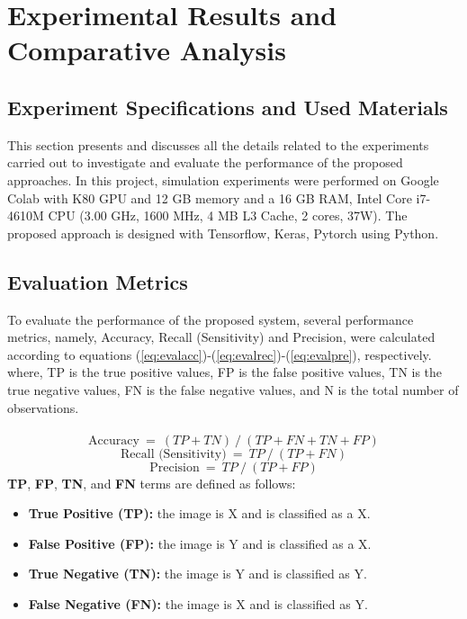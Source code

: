 \chapter{Experimental Results and Comparative Analysis}

\section{Experiment Specifications and Used Materials}

This section presents and discusses all the details related to the experiments 
carried out to investigate and evaluate the performance of the proposed approaches. 
In this project, simulation experiments were performed on Google Colab with K80 GPU 
and 12 GB memory and a 16 GB RAM, Intel Core i7-4610M CPU (3.00 GHz, 1600 MHz, 4 MB 
L3 Cache, 2 cores, 37W).
The proposed approach is designed with Tensorflow, Keras, Pytorch using Python.

\section{Evaluation Metrics}

To evaluate the performance of the proposed system, several performance metrics, 
namely, Accuracy, Recall (Sensitivity) and Precision, were calculated according to 
equations (\ref{eq:evalacc})-(\ref{eq:evalrec})-(\ref{eq:evalpre}), respectively. where, TP is the true positive values, FP is 
the false positive values, TN is the true negative values, FN is the false negative 
values, and N is the total number of observations. \\\\

\begin{equation} \label{eq:evalacc}
  \text{Accuracy} \ = \ (T P + T N) \ / \ (T P + F N + T N + F P)
\end{equation}
\begin{equation} \label{eq:evalrec}
  \text{Recall\ (Sensitivity)} \ = \ T P \ / \ (T P + F N)
\end{equation}
\begin{equation} \label{eq:evalpre}
  \text{Precision} \ = \ T P \ / \ (T P + F P)
\end{equation}
{\bf TP}, {\bf FP}, {\bf TN}, and {\bf FN} terms are defined as follows:
\begin{itemize}
  \item \textbf{True Positive (TP):} the image is X and is classified as a X.
  \item \textbf{False Positive (FP):} the image is Y and is classified as a X.
  \item \textbf{True Negative (TN):} the image is Y and is classified as Y.
  \item \textbf{False Negative (FN):} the image is X and is classified as Y.
\end{itemize}



